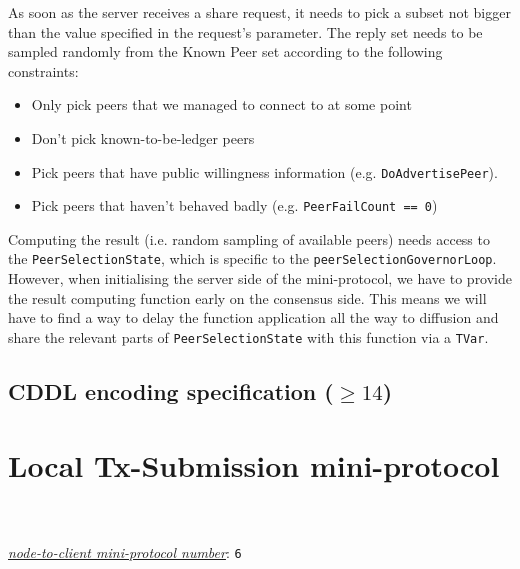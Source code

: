 As soon as the server receives a share request, it needs to pick a subset not bigger than the
value specified in the request's parameter. The reply set needs to be sampled randomly
from the Known Peer set according to the following constraints:

\begin{itemize}
  \item Only pick peers that we managed to connect to at some point
  \item Don't pick known-to-be-ledger peers
  \item Pick peers that have public willingness information (e.g. \texttt{DoAdvertisePeer}).
  \item Pick peers that haven't behaved badly (e.g. \texttt{PeerFailCount == 0})
\end{itemize}

Computing the result (i.e. random sampling of available peers) needs access to the
\texttt{PeerSelectionState}, which is specific to the \texttt{peerSelectionGovernorLoop}. However, when
initialising the server side of the mini-protocol, we have to provide the result computing
function early on the consensus side. This means we will have to find a way to delay the
function application all the way to diffusion and share the relevant parts of
\texttt{PeerSelectionState} with this function via a \texttt{TVar}.

\subsection{CDDL encoding specification ($\geq 14$)}\label{peersharing-cddl}


\section{Local Tx-Submission mini-protocol}
\\
\\
\hyperref[table:node-to-client-protocol-numbers]{\textit{node-to-client mini-protocol number}}: \texttt{6}\\
\label{local-tx-submission-protocol}
